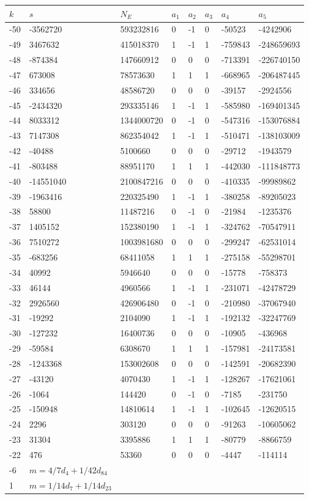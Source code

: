 \documentclass{amsart}
\begin{document}
\begin{longtable}{|l|l|l|lllll|}
\hline
$k$ & $s$ & $N_E$ & $a_1$ & $a_2$ & $a_3$ & $a_4$ & $a_5$\\
\hline
-50&-3562720&593232816&0&-1&0&-50523&-4242906\\
-49&3467632&415018370&1&-1&1&-759843&-248659693\\
-48&-874384&147660912&0&0&0&-713391&-226740150\\
-47&673008&78573630&1&1&1&-668965&-206487445\\
-46&334656&48586720&0&0&0&-39157&-2924556\\
-45&-2434320&293335146&1&-1&1&-585980&-169401345\\
-44&8033312&1344000720&0&-1&0&-547316&-153076884\\
-43&7147308&862354042&1&-1&1&-510471&-138103009\\
-42&-40488&5100660&0&0&0&-29712&-1943579\\
-41&-803488&88951170&1&1&1&-442030&-111848773\\
-40&-14551040&2100847216&0&0&0&-410335&-99989862\\
-39&-1963416&220325490&1&-1&1&-380258&-89205023\\
-38&58800&11487216&0&-1&0&-21984&-1235376\\
-37&1405152&152380190&1&-1&1&-324762&-70547911\\
-36&7510272&1003981680&0&0&0&-299247&-62531014\\
-35&-683256&68411058&1&1&1&-275158&-55298701\\
-34&40992&5946640&0&0&0&-15778&-758373\\
-33&46144&4960566&1&-1&1&-231071&-42478729\\
-32&2926560&426906480&0&-1&0&-210980&-37067940\\
-31&-19292&2104090&1&-1&1&-192132&-32247769\\
-30&-127232&16400736&0&0&0&-10905&-436968\\
-29&-59584&6308670&1&1&1&-157981&-24173581\\
-28&-1243368&153002608&0&0&0&-142591&-20682390\\
-27&-43120&4070430&1&-1&1&-128267&-17621061\\
-26&-1064&144420&0&-1&0&-7185&-231750\\
-25&-150948&14810614&1&-1&1&-102645&-12620515\\
-24&2296&303120&0&0&0&-91263&-10605062\\
-23&31304&3395886&1&1&1&-80779&-8866759\\
-22&476&53360&0&0&0&-4447&-114114\\
-6&$m=4/7d_{4}+1/42d_{84}$&&\multicolumn{5}{c|}{}\\
1&$m=1/14d_{7}+1/14d_{23}$&&\multicolumn{5}{c|}{}\\
\hline
\end{longtable}
\end{document}
